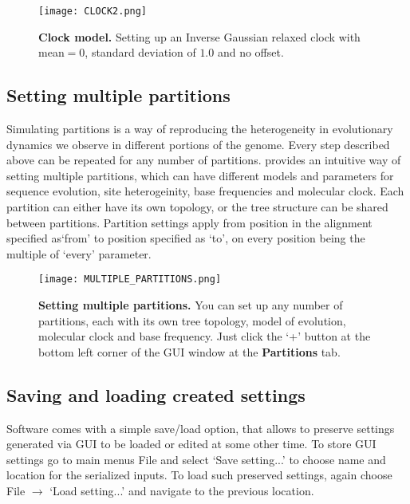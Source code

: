 \begin{figure}[h!]
\centering
\texttt{[image: CLOCK2.png]} 
\caption{
{ \footnotesize 
{\bf Clock model.}
Setting up an Inverse Gaussian relaxed clock with mean$=0$, standard deviation of $1.0$ and no offset.
} %
}
\label{fig:clock2}
\end{figure}

\subsection{Setting multiple partitions}

Simulating partitions is a way of reproducing the heterogeneity in evolutionary dynamics we observe in different portions of the genome. Every step described above can be repeated for any number of partitions. 
{\bussname} provides an intuitive way of setting multiple partitions, which can have different models and parameters for sequence evolution, site heterogeinity, base frequencies and molecular clock.
Each partition can either have its own topology, or the tree structure can be shared between partitions.
Partition settings apply from position in the alignment specified as`from' to position specified as `to', on every position being the multiple of `every' parameter.

\begin{figure}[h!]
\centering
\texttt{[image: MULTIPLE\_PARTITIONS.png]} 
\caption{
{ \footnotesize 
{\bf Setting multiple partitions.}
You can set up any number of partitions, each with its own tree topology, model of evolution, molecular clock and base frequency. 
Just click the `+' button at the bottom left corner of the GUI window at the \textbf{Partitions} tab.
} %
}
\label{fig:partitions}
\end{figure}

\subsection{Saving and loading created settings}
Software comes with a simple save/load option, that allows to preserve settings generated via GUI to be loaded or edited at some other time. To store GUI settings go to main menus File and select `Save setting...' to choose name and location for the serialized inputs. 
To load such preserved settings, again choose File $\longrightarrow$ `Load setting...' and navigate to the previous location.

